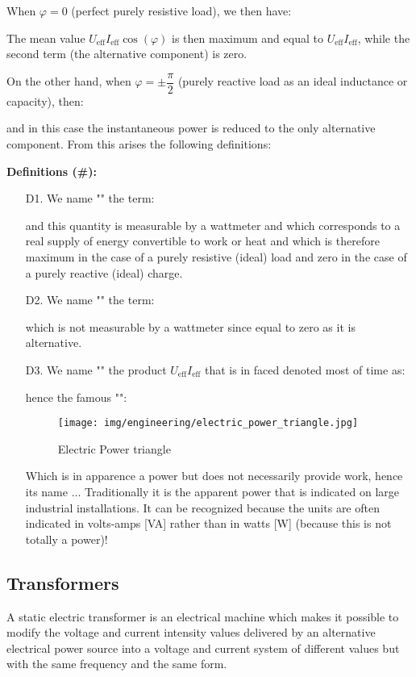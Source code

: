 	When $\varphi=0$ (perfect purely resistive load), we then have:
	
	The mean value $U_\text{eff}I_\text{eff}\cos(\varphi)$ is then maximum and equal to $U_\text{eff}I_\text{eff}$, while the second term (the alternative component) is zero.

	On the other hand, when $\varphi=\pm\dfrac{\pi}{2}$ (purely reactive load as an ideal inductance or capacity), then:
	
	and in this case the instantaneous power is reduced to the only alternative component. From this arises the following definitions:
	
	\textbf{Definitions (\#\mydef):}
	\begin{enumerate}
		\item[D1.] We name "" the term:
		
		and this quantity is measurable by a wattmeter and which corresponds to a real supply of energy convertible to work or heat and which is therefore maximum in the case of a purely resistive (ideal) load and zero in the case of a purely reactive (ideal) charge.

		\item[D2.] We name "" the term:
		
		which is not measurable by a wattmeter since equal to zero as it is alternative.

		\item[D3.] We name "" the product $U_\text{eff}I_\text{eff}$ that is in faced denoted most of time as:
		
		hence the famous "":
		\begin{figure}[H]
		\centering
		\texttt{[image: img/engineering/electric\_power\_triangle.jpg]}
		\caption{Electric Power triangle}
	\end{figure}
		Which is in apparence a power but does not necessarily provide work, hence its name ... Traditionally it is the apparent power that is indicated on large industrial installations. It can be recognized because the units are often indicated in volts-amps [VA] rather than in watts [W] (because this is not totally a power)!
	\end{enumerate} 	
	
	\subsection{Transformers}
	A static electric transformer is an electrical machine which makes it possible to modify the voltage and current intensity values delivered by an alternative electrical power source into a voltage and current system of different values but with the same frequency and the same form.
	
